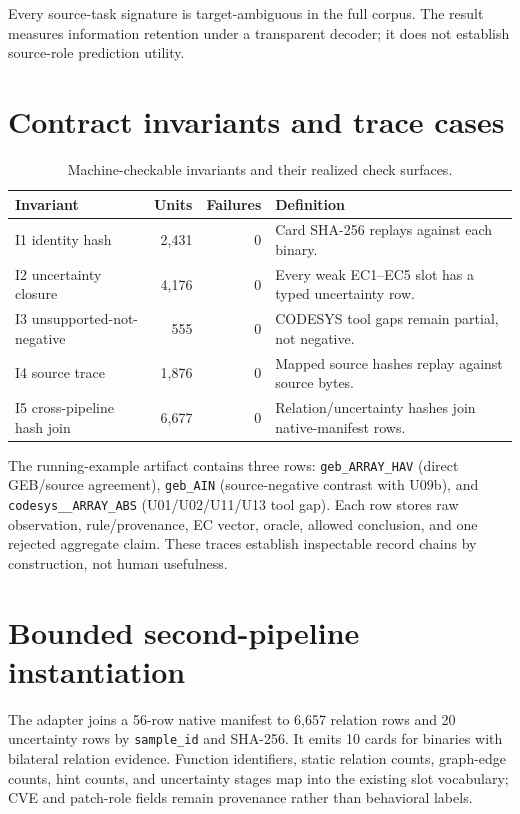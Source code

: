 \documentclass[manuscript,screen,review]{acmart}
\begin{document}
Every source-task signature is target-ambiguous in the full corpus. The result measures information retention under a transparent decoder; it does not establish source-role prediction utility.

\section{Contract invariants and trace cases}

\begin{table}[t]
\centering
\small
\caption{Machine-checkable invariants and their realized check surfaces.}
\label{tab:contract_invariants}
\begin{tabularx}{\textwidth}{>{\raggedright\arraybackslash}p{}rr>{\raggedright\arraybackslash}X}
\toprule
Invariant & Units & Failures & Definition \\
\midrule
I1 identity hash & 2,431 & 0 & Card SHA-256 replays against each binary. \\
I2 uncertainty closure & 4,176 & 0 & Every weak EC1--EC5 slot has a typed uncertainty row. \\
I3 unsupported-not-negative & 555 & 0 & CODESYS tool gaps remain partial, not negative. \\
I4 source trace & 1,876 & 0 & Mapped source hashes replay against source bytes. \\
I5 cross-pipeline hash join & 6,677 & 0 & Relation/uncertainty hashes join native-manifest rows. \\
\bottomrule
\end{tabularx}
\end{table}

The running-example artifact contains three rows: \texttt{geb\_ARRAY\_HAV} (direct GEB/source agreement), \texttt{geb\_AIN} (source-negative contrast with U09b), and \texttt{codesys\_\_ARRAY\_ABS} (U01/U02/U11/U13 tool gap). Each row stores raw observation, rule/provenance, EC vector, oracle, allowed conclusion, and one rejected aggregate claim. These traces establish inspectable record chains by construction, not human usefulness.

\section{Bounded second-pipeline instantiation}

The adapter joins a 56-row native manifest to 6{,}657 relation rows and 20 uncertainty rows by \texttt{sample\_id} and SHA-256. It emits 10 cards for binaries with bilateral relation evidence. Function identifiers, static relation counts, graph-edge counts, hint counts, and uncertainty stages map into the existing slot vocabulary; CVE and patch-role fields remain provenance rather than behavioral labels.
\end{document}

